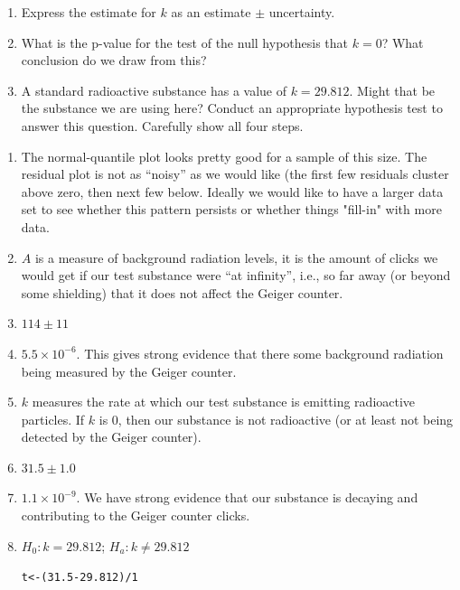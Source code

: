 \documentclass[twoside]{book}
\makeatletter
\newcommand{\hlnum}[1]{\textcolor[rgb]{0.686,0.059,0.569}{#1}}%
\newcommand{\hlopt}[1]{\textcolor[rgb]{0,0,0}{#1}}%
\newcommand{\hlstd}[1]{\textcolor[rgb]{0.345,0.345,0.345}{#1}}%
\newcommand{\hlkwb}[1]{\textcolor[rgb]{0.69,0.353,0.396}{#1}}%
\newenvironment{kframe}{%
 \def\at@end@of@kframe{}%
 \ifinner\ifhmode%
  \def\at@end@of@kframe{\end{minipage}}%
  \begin{minipage}{\columnwidth}%
 \fi\fi%
 \def\FrameCommand##1{\hskip\@totalleftmargin \hskip-\fboxsep
 \colorbox{shadecolor}{##1}\hskip-\fboxsep
     \hskip-\linewidth \hskip-\@totalleftmargin \hskip\columnwidth}%
 \MakeFramed {\advance\hsize-\width
   \@totalleftmargin\z@ \linewidth\hsize
   \@setminipage}}%
 {\par\unskip\endMakeFramed%
 \at@end@of@kframe}
\newenvironment{knitrout}{}{} %
\makeatother
\begin{document}
\begin{problem}
\begin{enumerate}
	\item
		Express the estimate for $k$ as an estimate $\pm$ uncertainty.
\item
	What is the p-value for the test of the null hypothesis that $k=0$?
	What conclusion do we draw from this?
\item
A standard radioactive substance has a value of $k=29.812$.  Might that be the
substance we are using here?  Conduct an appropriate hypothesis test to answer
this question.  Carefully show all four steps.
\end{enumerate}
\end{problem}

\begin{solution}
	\begin{enumerate}
			\item
				The normal-quantile plot looks pretty good for a sample of this size.
				The residual plot is not as ``noisy'' as we would like (the first few residuals
				cluster above zero, then next few below.  Ideally we would like to have a larger 
				data set to see whether this pattern persists or whether things "fill-in" with more
				data.
			\item
				$A$ is a measure of background radiation levels, it is the amount of clicks 
				we would get if our test substance were ``at infinity'', i.e., so far away (or 
				beyond some shielding) that it does not affect the Geiger counter.
			\item
				$114 \pm 11$
			\item
				\ensuremath{5.5\times 10^{-6}}.  This gives strong evidence that there some background radiation
				being measured by the Geiger counter.
			\item
				$k$ measures the rate at which our test substance is emitting radioactive 
				particles.  If $k$ is 0, then our substance is not radioactive (or at least not
				being detected by the Geiger counter).
			\item
				$31.5  \pm 1.0$
			\item
				\ensuremath{1.1\times 10^{-9}}.  We have strong evidence that our substance is decaying and 
				contributing to the Geiger counter clicks.
			\item
				$H_0: k = 29.812$;  $H_a: k \neq 29.812$
\begin{knitrout}
\color{fgcolor}\begin{kframe}
\begin{alltt}
\hlstd{t} \hlkwb{<-} \hlstd{(}\hlnum{31.5} \hlopt{-} \hlnum{29.812}\hlstd{)}\hlopt{/}\hlnum{1}

\end{alltt}
\end{kframe}
\end{knitrout}
\end{enumerate}
\end{solution}
\end{document}
